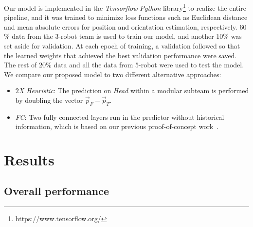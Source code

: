 \documentclass[letterpaper, 10 pt, conference]{ieeeconf}  %
\begin{document}
    Our model is implemented in the \emph{Tensorflow} \emph{Python}
    library\footnote{https://www.tensorflow.org/} to realize the entire
    pipeline, and it was trained to minimize loss functions such as
    Euclidean distance and mean absolute errors for position and
    orientation estimation, respectively. $60$\% data from the $3$-robot
    team is used to train our model, and another $10\%$ was set aside
    for validation. At each epoch of training, a validation followed so
    that the learned weights that achieved the best validation
    performance were saved. The rest of $20\%$ data and all the data
    from $5$-robot were used to test the model. We compare our proposed
    model to two different alternative approaches:
	\begin{itemize}
		\item \emph{$2$X Heuristic}:
            The prediction on \emph{Head} within a modular subteam is
            performed by doubling the vector $\vec{p}_{F} -
            \vec{p}_{T}$.

		\item \emph{FC}:
            Two fully connected layers run in the predictor without
            historical information, which is based on our previous
            proof-of-concept work~\cite{CPR17}.

	\end{itemize}

    \section{Results}
    \label{sec:results}

	\subsection{Overall performance}
	\label{sec:overall_performance}
\end{document}
